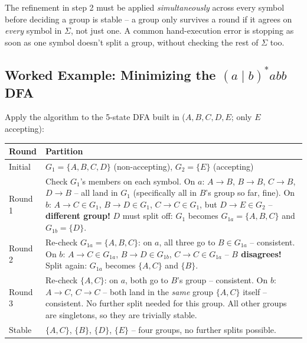 \documentclass[full-course-notes.tex]{subfiles}
\begin{document}
\begin{examfocus}
The refinement in step 2 must be applied \emph{simultaneously} across every symbol before
deciding a group is stable -- a group only survives a round if it agrees on \emph{every} symbol
in $\Sigma$, not just one. A common hand-execution error is stopping as soon as one symbol
doesn't split a group, without checking the rest of $\Sigma$ too.
\end{examfocus}

\subsection{Worked Example: Minimizing the $(a\mid b)^{*}abb$ DFA}
\label{sec:l6-minimization-worked}

\dbtag Apply the algorithm to the 5-state DFA built in 
($A,B,C,D,E$; only $E$ accepting):

\begin{center}
\renewcommand{\arraystretch}{1.3}
\small
\begin{tabularx}{\textwidth}{@{}l X@{}}
\toprule
\textbf{Round} & \textbf{Partition} \\
\midrule
Initial & $G_1 = \{A,B,C,D\}$ (non-accepting), $G_2 = \{E\}$ (accepting) \\
Round 1 & Check $G_1$'s members on each symbol. On $a$: $A\to B$, $B\to B$, $C\to B$, $D\to B$
-- all land in $G_1$ (specifically all in $B$'s group so far, fine). On $b$: $A\to C \in G_1$,
$B\to D \in G_1$, $C\to C \in G_1$, but $D\to E \in G_2$ -- \textbf{different group!} $D$ must
split off: $G_1$ becomes $G_{1a}=\{A,B,C\}$ and $G_{1b}=\{D\}$. \\
Round 2 & Re-check $G_{1a}=\{A,B,C\}$: on $a$, all three go to $B \in G_{1a}$ -- consistent. On
$b$: $A\to C\in G_{1a}$, $B\to D\in G_{1b}$, $C\to C\in G_{1a}$ -- \textbf{$B$ disagrees!} Split
again: $G_{1a}$ becomes $\{A,C\}$ and $\{B\}$. \\
Round 3 & Re-check $\{A,C\}$: on $a$, both go to $B$'s group -- consistent. On $b$: $A\to C$,
$C\to C$ -- both land in the \emph{same} group $\{A,C\}$ itself -- consistent. No further split
needed for this group. All other groups are singletons, so they are trivially stable. \\
Stable & $\{A,C\}$, $\{B\}$, $\{D\}$, $\{E\}$ -- four groups, no further splits possible. \\
\bottomrule
\end{tabularx}
\end{center}
\end{document}
